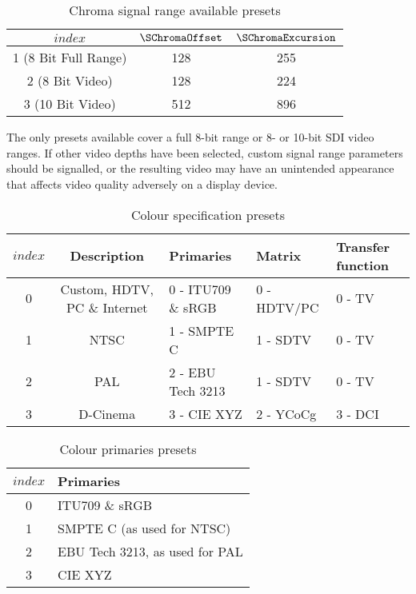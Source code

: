 \begin{table}[!ht]
\centering
\begin{tabular}{|c|c|c|}
\hline
$index$ & $\SChromaOffset$ & $\SChromaExcursion$ \\
\hline
1 (8 Bit Full Range) & 128 & 255 \\
\hline
2 (8 Bit Video) & 128 & 224 \\
\hline
3 (10 Bit Video) & 512 & 896 \\
\hline
\end{tabular}
\caption{Chroma signal range available presets}\label{table:chromasignalrangevalues}
\end{table}

\begin{informative}
The only presets available cover a full 8-bit range or 8- or 10-bit SDI video ranges.
If other video depths have been selected, custom signal range parameters
should be signalled, or the resulting video may have an unintended appearance that
affects video quality adversely on a display device.
\end{informative}

\begin{table}[!ht]
\centering
\begin{tabular}{|c|c|l|l|l|}
\hline
$index$ & {\bf Description}           & {\bf Primaries}       & {\bf Matrix}  & {\bf Transfer function}\\
\hline
0 & Custom, HDTV, PC \& Internet & 0 - ITU709 \& sRGB & 0 - HDTV/PC & 0 - TV \\ 
\hline
1 & NTSC                                    & 1 - SMPTE C           & 1 - SDTV      & 0 - TV \\
\hline
2 & PAL                                       & 2 - EBU Tech 3213   & 1 - SDTV      & 0 - TV \\
\hline
3 & D-Cinema                              & 3 - CIE XYZ             & 2 - YCoCg     & 3 - DCI \\
\hline
\end{tabular}
\caption{Colour specification presets}\label{table:colourspecvalues}
\end{table}

\begin{table}[!ht]
\centering
\begin{tabular}{|c|l|}
\hline
$index$ &  {\bf Primaries}      \\
\hline
0          &  ITU709 \& sRGB  \\ 
\hline
1          &  SMPTE C (as used for NTSC)          \\
\hline
2          &  EBU Tech 3213, as used for PAL   \\
\hline
3          & CIE XYZ              \\
\hline
\end{tabular}
\caption{Colour primaries presets}\label{table:primariesvalues}
\end{table}

